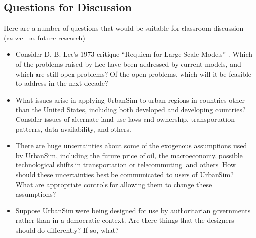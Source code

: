 \subsection{Questions for Discussion}

Here are a number of questions that would be suitable for classroom
discussion (as well as future research).

\begin{itemize}

\item Consider D. B. Lee's 1973 critique ``Requiem for Large-Scale Models''
  \cite{lee-1973}.  Which of the problems raised by Lee have been addressed
  by current models, and which are still open problems?  Of the open
  problems, which will it be feasible to address in the next decade?

\item What issues arise in applying UrbanSim to urban regions in countries
  other than the United States, including both developed and developing
  countries?  Consider issues of alternate land use laws and ownership,
  transportation patterns, data availability, and others.

\item There are huge uncertainties about some of the exogenous assumptions
  used by UrbanSim, including the future price of oil, the macroeconomy,
  possible technological shifts in transportation or telecommuting, and
  others.  How should these uncertainties best be communicated to users of
  UrbanSim?  What are appropriate controls for allowing them to change
  these assumptions?

\item Suppose UrbanSim were being designed for use by authoritarian
  governments rather than in a democratic context.  Are there things that
  the designers should do differently?  If so, what?

\end{itemize}

